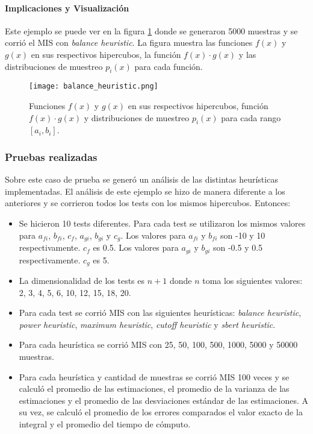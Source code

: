 \documentclass{article}
\begin{document}
\paragraph{Implicaciones y Visualización}
Este ejemplo se puede ver en la figura \ref{fig:mis3} donde se generaron 5000 muestras y se corrió el MIS con \textit{balance heuristic}.
La figura muestra las funciones \( f(x) \) y \( g(x) \) en sus respectivos hipercubos, la función \( f(x) \cdot g(x) \) y las distribuciones de muestreo \( p_{i}(x) \) para cada función.

\begin{figure}[H]
\texttt{[image: balance\_heuristic.png]}
\caption{Funciones \( f(x) \) y \( g(x) \) en sus respectivos hipercubos, función \( f(x) \cdot g(x) \) y distribuciones de muestreo \( p_{i}(x) \) para cada rango \( [a_{i}, b_{i}] \).}
\label{fig:mis3}
\end{figure}

\subsubsection{Pruebas realizadas}

Sobre este caso de prueba se generó un análisis de las distintas heurísticas implementadas.
El análisis de este ejemplo se hizo de manera diferente a los anteriores y se corrieron todos los tests con los mismos hipercubos.
Entonces:
\begin{itemize}
\item Se hicieron 10 tests diferentes. Para cada test se utilizaron los mismos valores para \( a_{fi} \), \( b_{fi} \), \( c_f \), \( a_{gi} \), \( b_{gi} \) y \( c_g \).
      Los valores para \( a_{fi} \) y \( b_{fi} \) son -10 y 10 respectivamente. \( c_f \) es 0.5.
      Los valores para \( a_{gi} \) y \( b_{gi} \) son -0.5 y 0.5 respectivamente. \( c_g \) es 5.
\item La dimensionalidad de los tests es \( n + 1 \) donde \( n \) toma los siguientes valores: 2, 3, 4, 5, 6, 10, 12, 15, 18, 20.
\item Para cada test se corrió MIS con las siguientes heurísticas: \textit{balance heuristic}, \textit{power heuristic}, \textit{maximum heuristic}, \textit{cutoff heuristic} y \textit{sbert heuristic}.
\item Para cada heurística se corrió MIS con 25, 50, 100, 500, 1000, 5000 y 50000 muestras.
\item Para cada heurística y cantidad de muestras se corrió MIS 100 veces y se calculó el promedio de las estimaciones,
      el promedio de la varianza de las estimaciones y el promedio de las desviaciones estándar de las estimaciones.
      A su vez, se calculó el promedio de los errores comparados el valor exacto de la integral y el promedio del tiempo de cómputo.
\end{itemize}
\end{document}
